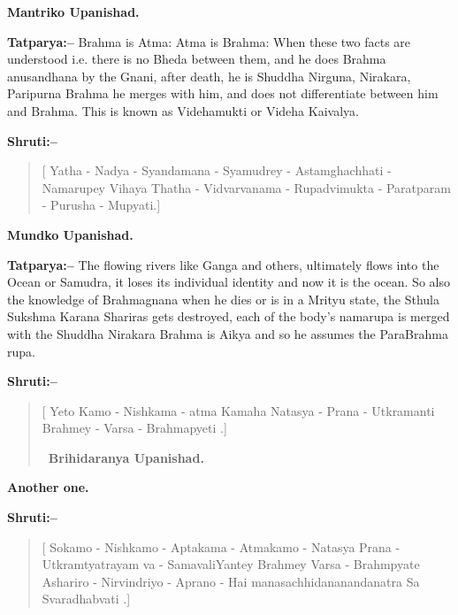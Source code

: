 \begin{flushright}
\textbf{Mantriko Upanishad.}
\end{flushright}

\textbf{Tatparya:–} Brahma is Atma: Atma is Brahma: When these two facts are understood i.e. there is no Bheda between them, and he does Brahma anusandhana by the Gnani, after death, he is Shuddha Nirguna, Nirakara, Paripurna Brahma he merges with him, and does not differentiate between him and Brahma. This is known as Videhamukti or Videha Kaivalya.

\textbf{Shruti:–}

\begin{verse}
[ Yatha - Nadya - Syandamana - Syamudrey - Astam\break ghachhati - Namarupey Vihaya  Thatha - Vidvarva\break nama - Rupadvimukta - Paratparam - Purusha - Mupyati.]
\end{verse}

\begin{flushright}
\textbf{Mundko Upanishad.}
\end{flushright}

\textbf{Tatparya:–} The flowing rivers like Ganga and others, ultimately flows into the Ocean or Samudra, it loses its individual identity and now it is the ocean. So also the knowledge of Brahmagnana when he dies or is in a Mrityu state, the Sthula Sukshma Karana Shariras gets destroyed, each of the body's namarupa is merged with the Shuddha Nirakara Brahma is Aikya and so he assumes the ParaBrahma rupa.

\textbf{Shruti:–}

\begin{verse}
[ Yeto Kamo - Nishkama - atma Kamaha Natasya - Prana - Utkramanti Brahmey - Varsa - Brahmapyeti .] 

~\hfill \textbf{Brihidaranya Upanishad.}
\end{verse}

\begin{center}
\textbf{Another one.}
\end{center}

\textbf{Shruti:–}

\begin{verse}
[ Sokamo - Nishkamo - Aptakama - Atmakamo - Natasya Prana - Utkramtyatrayam va - SamavaliYantey  Brahmey Varsa - Brahmpyate  Ashariro - Nirvindriyo - Aprano - Hai manasachhidananandanatra Sa Svaradhabvati .]
\end{verse}

